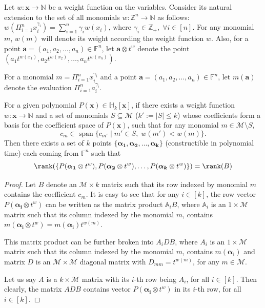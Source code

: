 \documentclass[final,oneeqnum, onethmnum, onefignum]{siamltex1213}
\newcommand{\N}{\mathbb N}
\newcommand{\A}{\mathbb A}
\newcommand{\Z}{\mathbb Z}
\newcommand{\Zp}{\mathbb{Z}_+}
\newcommand{\F}{\mathbb F}
\newcommand{\abs}[1]{\lvert #1 \rvert}
\newcommand{\M}{\mathcal M}
\DeclareMathOperator{\Span}{span}
\renewcommand{\H}{\mathbb H}
\begin{document}
{Let $w \colon {\mathbf x} \to \N$ be a weight function on the variables. 
Consider its natural extension to the set of all monomials 
$w \colon \Z^n \to \N$ as follows: 
$w(\Pi_{i=1}^n x_i^{\gamma_i}) = \sum_{i=1}^n \gamma_i w(x_i)$, 
where $\gamma_i \in \Zp , \; \forall i \in [n]$. 
For any monomial $m$, $w(m)$ will denote its weight according the
weight function $w$. 
Also, for a point ${\mathbf a} = (a_1, a_2, \dots, a_n) \in \F^n$,
let ${\mathbf a} \otimes t^w$ denote the point 
$(a_1 t^{w(x_1)}, a_2 t^{w(x_2)}, \dots, a_n t^{w(x_n)})$.

For a monomial $m =  \Pi_{i=1}^n x_i^{\gamma_i}$ and a point
${\mathbf a} = (a_1, a_2, \dots, a_n) \in \F^n$,
let $m({\mathbf a})$ denote the evaluation $\Pi_{i=1}^n a_i^{\gamma_i}$.

\begin{lemma}
\label{lem:evaluations}
For a given polynomial $P({\mathbf x}) \in \H_k[{\mathbf x}]$, if there exists 
a weight function $w \colon {\mathbf x} \to \N$ 
and a set of monomials $S \subseteq \M$ ($k' := \abs{S} \leq k$)
whose coefficients form a basis for the coefficient space of $P({\mathbf x})$, 
such that 
for any monomial $m \in \M \setminus S$, 
$$ c_m \in \Span \{c_{m'} \mid m' \in S, \; w(m') < w(m) \}.$$
Then there exists a set of $k$ points 
$\{ \boldsymbol{ \alpha_1}, \boldsymbol{ \alpha_2}, \dots, \boldsymbol{ \alpha_k} \}$ 
(constructible in polynomial time) each coming from $\F^n$ such that
$$\rank(\{P(\boldsymbol{ \alpha_1} \otimes t^w), P(\boldsymbol{ \alpha_2} \otimes t^w), 
\dots, P(\boldsymbol{ \alpha_k} \otimes t^w)\})
= \rank (B) $$
\end{lemma}
\begin{proof}
Let $B$ denote an $\M \times k$ matrix such that
 its row indexed by monomial $m$ contains the coefficient $c_m$.
It is easy to see that for any $i \in [k]$,
 the row vector $P(\boldsymbol{ \alpha_i} \otimes t^w)$ 
can be written as the matrix product $\A_i B$, 
where $\A_i$ is an $1 \times \M$ matrix such that its column
indexed by the monomial $m$,
contains $m(\boldsymbol{ \alpha_i} \otimes t^w) = m(\boldsymbol{\alpha_i}) t^{w(m)}$.

This matrix product can be further broken into $A_i D B$, where
$A_i$ is an $1 \times \M$ matrix such that its column
indexed by the monomial $m$,
 contains $m(\boldsymbol{ \alpha_i})$ and 
matrix $D$ is an $\M \times \M$ diagonal matrix with 
$D_{mm} = t^{w(m)}$, for any $m \in \M$.

Let us say $A$ is a $k \times \M$ matrix with its $i$-th row being
$A_i$, for all $i \in [k]$.
Then clearly, the matrix $ADB$ contains vector 
$P(\boldsymbol{ \alpha_i} \otimes t^w)$ in its $i$-th row, for all $i \in [k]$. 


\end{proof}}
\end{document}
